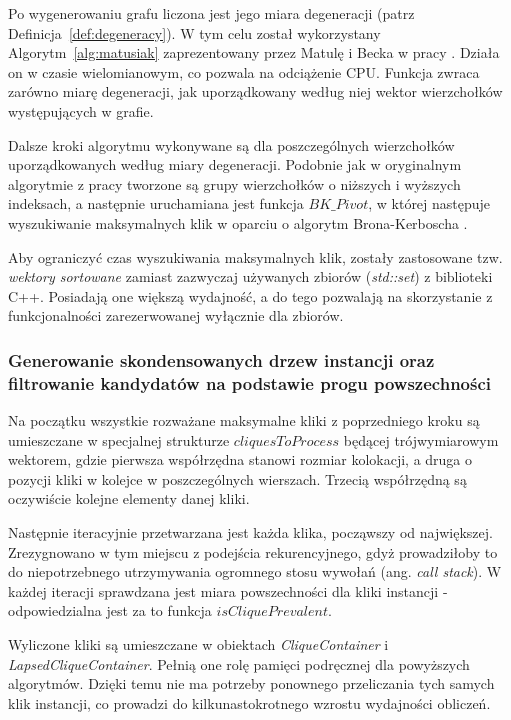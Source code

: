 \documentclass[12pt]{article}
\begin{document}
Po wygenerowaniu grafu liczona jest jego miara degeneracji (patrz Definicja~\ref{def:degeneracy}). W tym celu został wykorzystany Algorytm~\ref{alg:matusiak} zaprezentowany przez Matulę i Becka w pracy \cite{matusiak}. Działa on w czasie wielomianowym, co pozwala na odciążenie CPU. Funkcja zwraca zarówno miarę degeneracji, jak uporządkowany według niej wektor wierzchołków występujących w grafie.

Dalsze kroki algorytmu wykonywane są dla poszczególnych wierzchołków uporządkowanych według miary degeneracji. Podobnie jak w oryginalnym algorytmie z pracy \cite{pivot} tworzone są grupy wierzchołków o niższych i wyższych indeksach, a następnie uruchamiana jest funkcja $ BK\_Pivot $, w której następuje wyszukiwanie maksymalnych klik w oparciu o algorytm Brona-Kerboscha \cite{kerbosz}.

Aby ograniczyć czas wyszukiwania maksymalnych klik, zostały zastosowane tzw. \textit{wektory sortowane} zamiast zazwyczaj używanych zbiorów (\textit{std::set}) z biblioteki C++. Posiadają one większą wydajność, a do tego pozwalają na skorzystanie z funkcjonalności zarezerwowanej wyłącznie dla zbiorów.

\subsubsection{Generowanie skondensowanych drzew instancji oraz filtrowanie kandydatów na podstawie progu powszechności}

Na początku wszystkie rozważane maksymalne kliki z poprzedniego kroku są umieszczane w specjalnej strukturze $ cliquesToProcess $ będącej trójwymiarowym wektorem, gdzie pierwsza współrzędna stanowi rozmiar kolokacji, a druga o pozycji kliki w kolejce w poszczególnych wierszach. Trzecią współrzędną są oczywiście kolejne elementy danej kliki.

Następnie iteracyjnie przetwarzana jest każda klika, począwszy od największej. Zrezygnowano w tym miejscu z podejścia rekurencyjnego, gdyż prowadziłoby to do niepotrzebnego utrzymywania ogromnego stosu wywołań (ang. \textit{call stack}). W każdej iteracji sprawdzana jest miara powszechności dla kliki instancji - odpowiedzialna jest za to funkcja $ isCliquePrevalent $.

Wyliczone kliki są umieszczane w obiektach \textit{CliqueContainer} i \textit{LapsedCliqueContainer}. Pełnią one rolę pamięci podręcznej dla powyższych algorytmów. Dzięki temu nie ma potrzeby ponownego przeliczania tych samych klik instancji, co prowadzi do kilkunastokrotnego wzrostu wydajności obliczeń.
\end{document}
